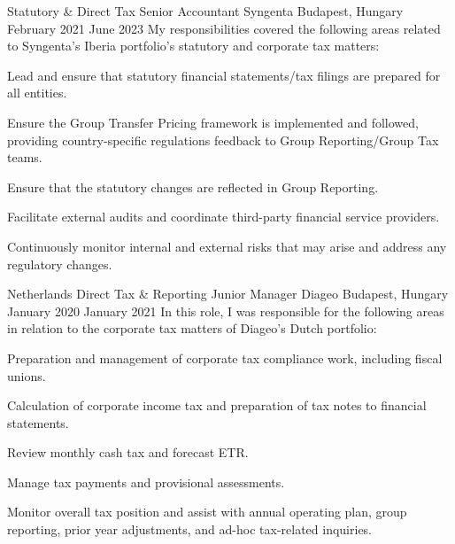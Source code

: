 \begin{cventries}
  \cventry
    {Statutory \& Direct Tax Senior Accountant} %
    {Syngenta} %
    {Budapest, Hungary} %
    {February 2021 \textendash June 2023} %
    {My responsibilities covered the following areas related to Syngenta's Iberia portfolio's statutory and corporate tax matters:} %
    {
      \begin{cvitems} %
        \item {Lead and ensure that statutory financial statements/tax filings are prepared for all entities.}
        \item {Ensure the Group Transfer Pricing framework is implemented and followed, providing country-specific regulations feedback to Group Reporting/Group Tax teams.}
        \item {Ensure that the statutory changes are reflected in Group Reporting.}
        \item {Facilitate external audits and coordinate third-party financial service providers.}
        \item {Continuously monitor internal and external risks that may arise and address any regulatory changes.}
      \end{cvitems}
    }


  \cventry
    {Netherlands Direct Tax \& Reporting Junior Manager} %
    {Diageo} %
    {Budapest, Hungary} %
    {January 2020 \textendash January 2021} %
    {In this role, I was responsible for the following areas in relation to the corporate tax matters of Diageo's Dutch portfolio:} %
    {
      \begin{cvitems} %
        \item {Preparation and management of corporate tax compliance work, including fiscal unions.}
        \item {Calculation of corporate income tax and preparation of tax notes to financial statements.}
        \item {Review monthly cash tax and forecast ETR.}
        \item {Manage tax payments and provisional assessments.}
        \item {Monitor overall tax position and assist with annual operating plan, group reporting, prior year adjustments, and ad-hoc tax-related inquiries.}
      \end{cvitems}
    }


\end{cventries}
